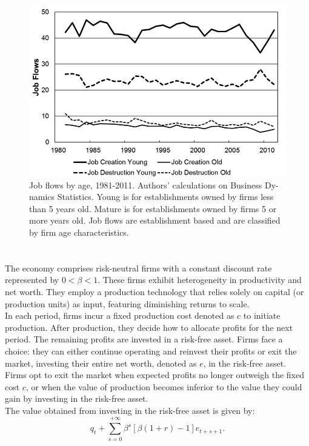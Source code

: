 \documentclass[12pt]{article}
\begin{document}
\begin{figure}
    \centering
    \includegraphics[scale = 0.6]{Plot1.2.png}
    \caption{Job ﬂows by age, 1981-2011. Authors' calculations on Business Dy-
    namics Statistics. Young is for establishments owned by ﬁrms less than 5 years old.
    Mature is for establishments owned by ﬁrms 5 or more years old. Job ﬂows are
    establishment based and are classiﬁed by ﬁrm age characteristics.
    }
    \label{plot:1.1}
\end{figure} 
\section{\cite{OsePap17}}
The economy comprises risk-neutral firms with a constant discount rate represented by $0 < \beta < 1$. These firms
exhibit heterogeneity in productivity and net worth. They employ a production technology that relies solely on capital
(or production units) as input, featuring diminishing returns to scale.
\\
In each period, firms incur a fixed production cost denoted as $c$ to initiate production. After production, they decide
how to allocate profits for the next period. The remaining profits are invested in a risk-free asset. Firms face a
choice: they can either continue operating and reinvest their profits or exit the market, investing their entire net
worth, denoted as $e$, in the risk-free asset.
\\
Firms opt to exit the market when expected profits no longer outweigh the fixed cost $c$, or when the value of
production becomes inferior to the value they could gain by investing in the risk-free asset.
\\
The value obtained from investing in the risk-free asset is given by:
\[
q_t + \sum_{s=0}^{+\infty}\beta^s[\beta(1+r)-1]e_{t+s+1}.
\]
\end{document}
